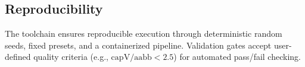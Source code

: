 \subsection{Reproducibility}

The toolchain ensures reproducible execution through deterministic random seeds, fixed presets, and a containerized pipeline. Validation gates accept user-defined quality criteria (e.g., $\mathrm{capV/aabb} < 2.5$) for automated pass/fail checking.

